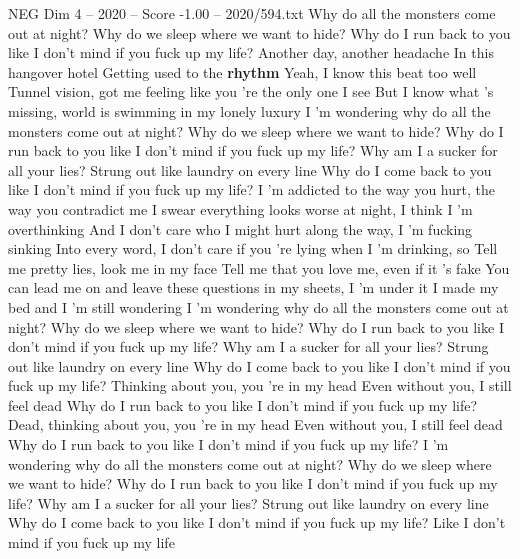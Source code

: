 \begin{textsample}{NEG Dim 4 – 2020 – Score -1.00 – 2020/594.txt}  \label{ex:f4_neg_024}
Why do all the monsters come out at night?
Why do we sleep where we want to hide?
Why do I run back to you like I don't mind if you fuck up my life?
Another day, another headache In this hangover hotel Getting used to the \textbf{rhythm} Yeah, I know this beat too well Tunnel vision, got me feeling like you 're the only one I see But I know what 's missing, world is swimming in my lonely luxury I 'm wondering why do all the monsters come out at night?
Why do we sleep where we want to hide?
Why do I run back to you like I don't mind if you fuck up my life?
Why am I a sucker for all your lies?
Strung out like laundry on every line Why do I come back to you like I don't mind if you fuck up my life?
I 'm addicted to the way you hurt, the way you contradict me I swear everything looks worse at night, I think I 'm overthinking And I don't care who I might hurt along the way, I 'm fucking sinking Into every word, I don't care if you 're lying when I 'm drinking, so Tell me pretty lies, look me in my face Tell me that you love me, even if it 's fake You can lead me on and leave these questions in my sheets, I 'm under it I made my bed and I 'm still wondering I 'm wondering why do all the monsters come out at night?
Why do we sleep where we want to hide?
Why do I run back to you like I don't mind if you fuck up my life?
Why am I a sucker for all your lies?
Strung out like laundry on every line Why do I come back to you like I don't mind if you fuck up my life?
Thinking about you, you 're in my head Even without you, I still feel dead Why do I run back to you like I don't mind if you fuck up my life?
Dead, thinking about you, you 're in my head Even without you, I still feel dead Why do I run back to you like I don't mind if you fuck up my life?
I 'm wondering why do all the monsters come out at night?
Why do we sleep where we want to hide?
Why do I run back to you like I don't mind if you fuck up my life?
Why am I a sucker for all your lies?
Strung out like laundry on every line Why do I come back to you like I don't mind if you fuck up my life?
Like I don't mind if you fuck up my life

\end{textsample}
